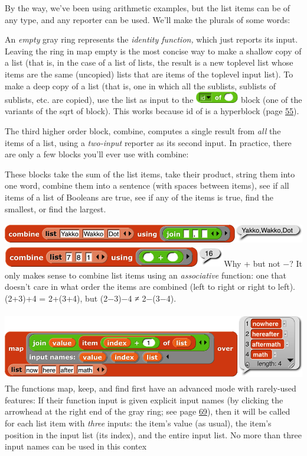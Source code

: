 By the way, we've been using arithmetic examples, but the list items can
be of any type, and any reporter can be used. We'll make the plurals of
some words:

An \emph{empty} gray ring represents the \emph{identity function,} which
just reports its input. Leaving the ring in map empty is the most
concise way to make a shallow copy of a list (that is, in the case of a
list of lists, the result is a new toplevel list whose items are the
same (uncopied) lists that are items of the toplevel input list). To
make a deep copy of a list (that is, one in which all the sublists,
sublists of sublists, etc. are copied), use the list as input to the
\includegraphics[width=0.74306in,height=0.19444in]{media/image576.png}
block (one of the variants of the sqrt of block). This works because id
of is a hyperblock (page \hyperref[hyperblocks]{55}).

The third higher order block, combine, computes a single result from
\emph{all} the items of a list, using a \emph{two-input} reporter as its
second input. In practice, there are only a few blocks you'll ever use
with combine:

These blocks take the sum of the list items, take their product, string
them into one word, combine them into a sentence (with spaces between
items), see if all items of a list of Booleans are true, see if any of
the items is true, find the smallest, or find the largest.

\includegraphics[width=6.27917in,height=0.37569in]{media/image585.png}\includegraphics[width=3.86806in,height=0.34514in]{media/image586.png}Why
+ but not −? It only makes sense to combine list items using an
\emph{associative} function: one that doesn't care in what order the
items are combined (left to right or right to left). (2+3)+4 = 2+(3+4),
but (2−3)−4 ≠ 2−(3−4).

\includegraphics[width=5.80833in,height=1.19097in]{media/image587.png}The
functions map, keep, and find first have an advanced mode with
rarely-used features: If their function input is given explicit input
names (by clicking the arrowhead at the right end of the gray ring; see
page \hyperref[formal-parameters]{69}), then it will be called for each
list item with \emph{three} inputs: the item's value (as usual), the
item's position in the input list (its index), and the entire input
list. No more than three input names can be used in this contex

